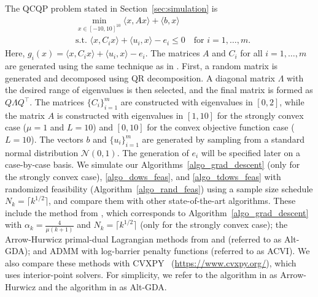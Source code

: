 \documentclass{article}
\def\la{\langle}
\def\ra{\rangle}
\theoremstyle{plain}
\theoremstyle{definition}
\theoremstyle{remark}
\begin{document}
The QCQP problem stated in Section~\ref{sec:simulation} is
\begin{align*}
    &\min_{x \in [-10,10]^{10}} \la x, A x \ra + \la b, x \ra \\
    & \text{s.t. } \la x , C_i x \ra + \la u_i , x \ra - e_i  \leq 0 \quad \text{for } i = 1, \ldots, m. 
\end{align*}
Here, $g_i(x) = \la x , C_i x \ra + \la u_i , x \ra - e_i$. The matrices $A$ and $C_i$ for all $i = 1, \ldots, m$ are generated using the same technique as in \cite{chakraborty2025randomized, chakraborty2024popov}. First, a random matrix is generated and decomposed using QR decomposition. A diagonal matrix $\Lambda$ with the desired range of eigenvalues is then selected, and the final matrix is formed as $Q \Lambda Q^\top$. The matrices $\{C_i\}_{i=1}^m$ are constructed with eigenvalues in $[0,2]$, while the matrix $A$ is constructed with eigenvalues in $[1,10]$ for the strongly convex case ($\mu = 1$ and $L = 10$) and $[0,10]$ for the convex objective function case ($L = 10$). The vectors $b$ and $\{u_i\}_{i=1}^m$ are generated by sampling from a standard normal distribution $\mathcal{N}(0,1)$. The generation of $e_i$ will be specified later on a case-by-case basis. We simulate our Algorithms~\ref{algo_grad_descent} (only for the strongly convex case), \ref{algo_dows_feas}, and \ref{algo_tdows_feas} with randomized feasibility (Algorithm~\ref{algo_rand_feas}) using a sample size schedule $N_k = \lceil k^{1/2} \rceil$, and compare them with other state-of-the-art algorithms. These include the method from \cite{nedic2019random}, which corresponds to Algorithm~\ref{algo_grad_descent} with $\alpha_k = \tfrac{4}{\mu(k+1)}$ and $N_k = \lceil k^{1/2} \rceil$ (only for the strongly convex case); the Arrow-Hurwicz primal-dual Lagrangian methods from \cite{he2022convergence} and \cite{zhang2022near} (referred to as Alt-GDA); and ADMM with log-barrier penalty functions \cite{yang2022solving} (referred to as ACVI). We also compare these methods with CVXPY~\cite{diamond2016cvxpy, agrawal2018rewriting} (\url{https://www.cvxpy.org/}), which uses interior-point solvers. For simplicity, we refer to the algorithm in \cite{he2022convergence} as Arrow-Hurwicz and the algorithm in \cite{zhang2022near} as Alt-GDA.



\end{document}
